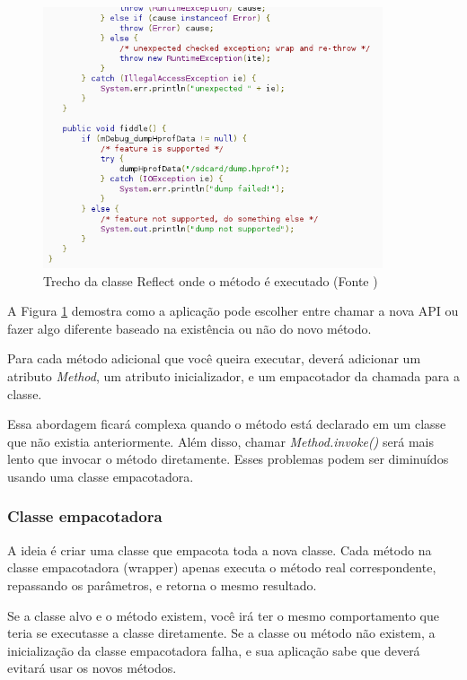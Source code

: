 \begin{figure}[h]
    \centering
    \includegraphics[width=10cm]{img/reflect2}
    \caption[Trecho da classe Reflect onde o método é executado]{Trecho da classe Reflect onde o método é executado (Fonte \cite{back_compat})}
    \label{class_reflect2}
\end{figure}

A Figura \ref{class_reflect2} demostra como a aplicação pode escolher entre chamar 
a nova API ou fazer algo diferente baseado na existência ou não do novo método.

Para cada método adicional que você queira executar, deverá adicionar um atributo 
{\it Method}, um atributo inicializador, e um empacotador da chamada para a classe.

Essa abordagem ficará complexa quando o método está declarado em um classe que não 
existia anteriormente. Além disso, chamar {\it Method.invoke()} será mais lento 
que invocar o método diretamente. Esses problemas podem ser diminuídos usando uma
classe empacotadora.

\subsubsection{Classe empacotadora}

A ideia é criar uma classe que empacota toda a nova classe. Cada método na classe 
empacotadora (wrapper) apenas executa o método real correspondente, repassando os 
parâmetros, e retorna o mesmo resultado.

Se a classe alvo e o método existem, você irá ter o mesmo comportamento que teria se 
executasse a classe diretamente. Se a classe ou método não existem, a inicialização
da classe empacotadora falha, e sua aplicação sabe que deverá evitará usar os novos 
métodos.

